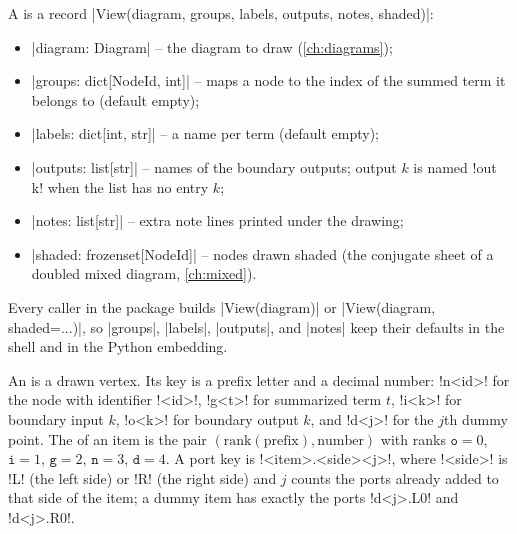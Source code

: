 \begin{definition}[View]\label{def:pictorial-view}
A  is a record \py|View(diagram, groups, labels, outputs, notes, shaded)|:
\begin{itemize}
  \item \py|diagram: Diagram| -- the diagram to draw (\cref{ch:diagrams});
  \item \py|groups: dict[NodeId, int]| -- maps a node to the index of the summed term it belongs
    to (default empty);
  \item \py|labels: dict[int, str]| -- a name per term (default empty);
  \item \py|outputs: list[str]| -- names of the boundary outputs; output $k$ is named
    \code!out k! when the list has no entry $k$;
  \item \py|notes: list[str]| -- extra note lines printed under the drawing;
  \item \py|shaded: frozenset[NodeId]| -- nodes drawn shaded (the conjugate sheet of a doubled
    mixed diagram, \cref{ch:mixed}).
\end{itemize}
Every caller in the package builds \py|View(diagram)| or \py|View(diagram, shaded=...)|, so
\py|groups|, \py|labels|, \py|outputs|, and \py|notes| keep their defaults in the shell and in
the Python embedding.
\end{definition}

\begin{definition}\label{def:pictorial-keys}
An  is a drawn vertex. Its key is a prefix letter and a decimal number:
\code!n<id>! for the node with identifier \code!<id>!, \code!g<t>! for summarized term $t$,
\code!i<k>! for boundary input $k$, \code!o<k>! for boundary output $k$, and \code!d<j>! for the
$j$th dummy point. The  of an item is the pair
$(\mathrm{rank}(\text{prefix}), \text{number})$ with ranks $\mathtt{o}=0$, $\mathtt{i}=1$,
$\mathtt{g}=2$, $\mathtt{n}=3$, $\mathtt{d}=4$. A port key is \code!<item>.<side><j>!, where
\code!<side>! is \code!L! (the left side) or \code!R! (the right side) and $j$ counts the ports
already added to that side of the item; a dummy item has exactly the ports \code!d<j>.L0! and
\code!d<j>.R0!.
\end{definition}


